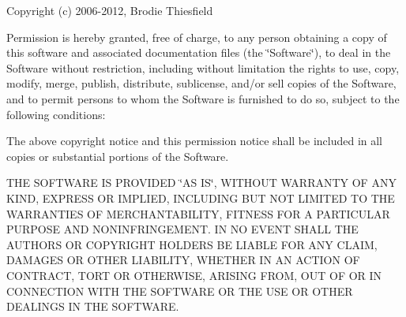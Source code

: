 Copyright (c) 2006-\/2012, Brodie Thiesfield

Permission is hereby granted, free of charge, to any person obtaining a copy of this software and associated documentation files (the \char`\"{}\+Software\char`\"{}), to deal in the Software without restriction, including without limitation the rights to use, copy, modify, merge, publish, distribute, sublicense, and/or sell copies of the Software, and to permit persons to whom the Software is furnished to do so, subject to the following conditions\+:

The above copyright notice and this permission notice shall be included in all copies or substantial portions of the Software.

T\+HE S\+O\+F\+T\+W\+A\+RE IS P\+R\+O\+V\+I\+D\+ED \char`\"{}\+A\+S I\+S\char`\"{}, W\+I\+T\+H\+O\+UT W\+A\+R\+R\+A\+N\+TY OF A\+NY K\+I\+ND, E\+X\+P\+R\+E\+SS OR I\+M\+P\+L\+I\+ED, I\+N\+C\+L\+U\+D\+I\+NG B\+UT N\+OT L\+I\+M\+I\+T\+ED TO T\+HE W\+A\+R\+R\+A\+N\+T\+I\+ES OF M\+E\+R\+C\+H\+A\+N\+T\+A\+B\+I\+L\+I\+TY, F\+I\+T\+N\+E\+SS F\+OR A P\+A\+R\+T\+I\+C\+U\+L\+AR P\+U\+R\+P\+O\+SE A\+ND N\+O\+N\+I\+N\+F\+R\+I\+N\+G\+E\+M\+E\+NT. IN NO E\+V\+E\+NT S\+H\+A\+LL T\+HE A\+U\+T\+H\+O\+RS OR C\+O\+P\+Y\+R\+I\+G\+HT H\+O\+L\+D\+E\+RS BE L\+I\+A\+B\+LE F\+OR A\+NY C\+L\+A\+IM, D\+A\+M\+A\+G\+ES OR O\+T\+H\+ER L\+I\+A\+B\+I\+L\+I\+TY, W\+H\+E\+T\+H\+ER IN AN A\+C\+T\+I\+ON OF C\+O\+N\+T\+R\+A\+CT, T\+O\+RT OR O\+T\+H\+E\+R\+W\+I\+SE, A\+R\+I\+S\+I\+NG F\+R\+OM, O\+UT OF OR IN C\+O\+N\+N\+E\+C\+T\+I\+ON W\+I\+TH T\+HE S\+O\+F\+T\+W\+A\+RE OR T\+HE U\+SE OR O\+T\+H\+ER D\+E\+A\+L\+I\+N\+GS IN T\+HE S\+O\+F\+T\+W\+A\+RE. 